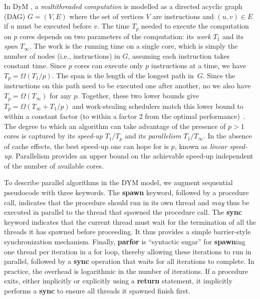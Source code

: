 In DyM \cite[Chapter~27]{Cormen2009}, a {\em multithreaded
computation} is modelled as a directed acyclic graph (DAG) $G=(V,E)$
where the set of vertices $V$ are instructions and $(u,v) \in E$ if
$u$ must be executed before $v$.  The time $T_p$ needed to execute the
computation on $p$ cores depends on two parameters of the computation:
its {\em work} $T_1$ and its {\em span} $T_\infty$.  The work is the
running time on a single core, which is simply the number of nodes
(i.e., instructions) in $G$, assuming each instruction takes constant
time.  Since $p$ cores can execute only $p$ instructions at a time, we
have $T_p = \Omega(T_1/p)$.  The span is the length of the longest
path in~$G$.  Since the instructions on this path need to be executed
one after another, no we also have $T_p = \Omega(T_\infty)$ for any
$p$.  Together, these two lower bounds give $T_p = \Omega(T_\infty +
T_1/p)$ and work-stealing schedulers match this lower bound to within
a constant factor (to within a factor 2 from the optimal
performance)~\cite{Blumofe:1999:SMC:324133.324234}.  The degree to
which an algorithm can take advantage of the presence of $p > 1$ cores
is captured by its {\em speed-up} $T_1 / T_p$ and its {\em
parallelism} $T_1 / T_\infty$.  In the absence of cache effects, the
best speed-up one can hope for is $p$, known as {\em linear speed-up}.
Parallelism provides an upper bound on the achievable speed-up
independent of the number of available cores.

To describe parallel algorithms in the DYM model, we augment
sequential pseudocode with three keywords.  The {\bf spawn} keyword,
followed by a procedure call, indicates that the procedure should run
in its own thread and {\em may} thus be executed in parallel to the
thread that spawned the procedure call.  The {\bf sync} keyword
indicates that the current thread must wait for the termination of all
the threads it has spawned before proceeding.  It thus provides a
simple barrier-style synchronization mechanism.  Finally, {\bf parfor}
is ``syntactic sugar'' for {\bf spawn}ing one thread per iteration in
a for loop, thereby allowing these iterations to run in parallel,
followed by a {\bf sync} operation that waits for all iterations to
complete.  In practice, the overhead is logarithmic in the number of
iterations.  If a procedure exits, either implicitly or explicitly
using a {\bf return} statement, it implicitly performs a {\bf sync} to
ensure all threads it spawned finish first.
